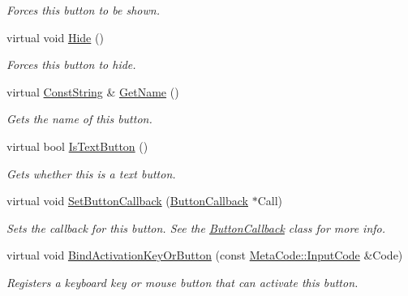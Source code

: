 \begin{DoxyCompactItemize}
\begin{DoxyCompactList}\small\item\em Forces this button to be shown. \item\end{DoxyCompactList}\item 
\hypertarget{classphys_1_1UI_1_1Button_a5a68803daf10281a85b4db1d4c18e412}{
virtual void \hyperlink{classphys_1_1UI_1_1Button_a5a68803daf10281a85b4db1d4c18e412}{Hide} ()}
\label{d8/d88/classphys_1_1UI_1_1Button_a5a68803daf10281a85b4db1d4c18e412}

\begin{DoxyCompactList}\small\item\em Forces this button to hide. \item\end{DoxyCompactList}\item 
virtual \hyperlink{namespacephys_a5ce5049f8b4bf88d6413c47b504ebb31}{ConstString} \& \hyperlink{classphys_1_1UI_1_1Button_a1b757862cd1f4935d62c05ef4596b8a0}{GetName} ()
\begin{DoxyCompactList}\small\item\em Gets the name of this button. \item\end{DoxyCompactList}\item 
virtual bool \hyperlink{classphys_1_1UI_1_1Button_a9c575f6433a5a455dc8c5de73d37839c}{IsTextButton} ()
\begin{DoxyCompactList}\small\item\em Gets whether this is a text button. \item\end{DoxyCompactList}\item 
virtual void \hyperlink{classphys_1_1UI_1_1Button_aa9f8c1e2e91e22405bacd298c88eb845}{SetButtonCallback} (\hyperlink{classphys_1_1UI_1_1ButtonCallback}{ButtonCallback} $\ast$Call)
\begin{DoxyCompactList}\small\item\em Sets the callback for this button. See the \hyperlink{classphys_1_1UI_1_1ButtonCallback}{ButtonCallback} class for more info. \item\end{DoxyCompactList}\item 
virtual void \hyperlink{classphys_1_1UI_1_1Button_a3b51fa981fdf869240bff082bafb56a9}{BindActivationKeyOrButton} (const \hyperlink{classphys_1_1MetaCode_a3e501cbb5bf0f6f1fdb7211465bda8d8}{MetaCode::InputCode} \&Code)
\begin{DoxyCompactList}\small\item\em Registers a keyboard key or mouse button that can activate this button. \item\end{DoxyCompactList}\item 

\end{DoxyCompactItemize}
